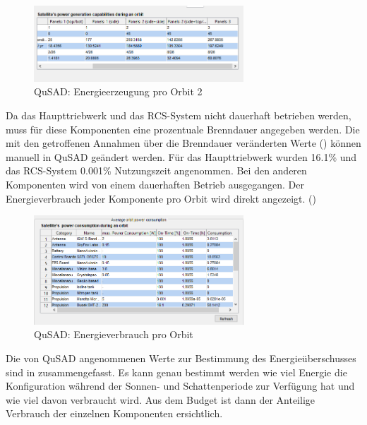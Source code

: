 			\begin{figure}[H]
				\centering
					\includegraphics[width=0.70\textwidth]{graphics/power4.PNG}
				\caption{QuSAD: Energieerzeugung pro Orbit 2}
				\label{fig:power4}
			\end{figure}
Da das Haupttriebwerk und das RCS-System nicht dauerhaft betrieben werden, muss für diese Komponenten eine prozentuale Brenndauer angegeben werden. Die mit den getroffenen Annahmen über die Brenndauer veränderten Werte  () können manuell in QuSAD geändert werden. Für das Haupttriebwerk wurden \num{16,1}\% und das RCS-System \num{0,001}\% Nutzungszeit angenommen. Bei den anderen Komponenten wird von einem dauerhaften Betrieb ausgegangen. Der Energieverbrauch jeder Komponente pro Orbit wird direkt angezeigt. ()
			
			\begin{figure}[H]
				\centering
					\includegraphics[width=0.70\textwidth]{graphics/power5.png}
				\caption{QuSAD: Energieverbrauch pro Orbit}
				\label{fig:power5}
			\end{figure}
Die von QuSAD angenommenen Werte zur Bestimmung des Energieüberschusses sind in   zusammengefasst. Es kann genau bestimmt werden wie viel Energie die Konfiguration während der Sonnen- und Schattenperiode zur Verfügung hat und wie viel davon verbraucht wird. Aus dem Budget ist dann der Anteilige Verbrauch der 
einzelnen Komponenten ersichtlich.

